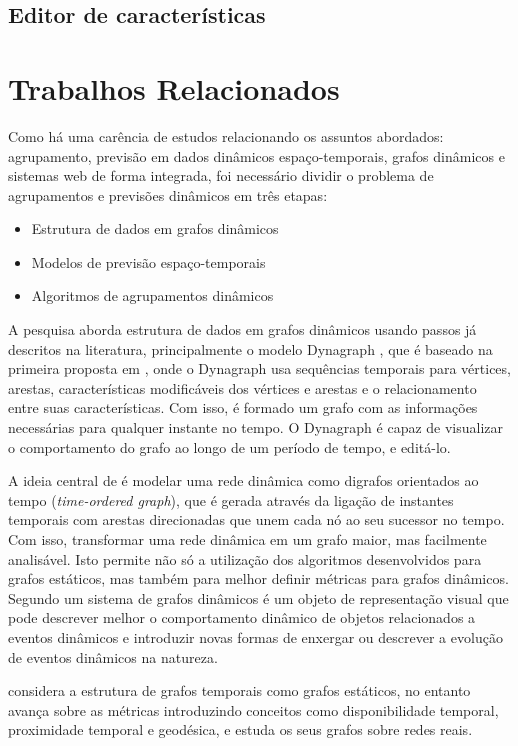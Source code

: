 \subsection{Editor de características}
\section{Trabalhos Relacionados}
 \label{trabalhos-relacionados} 
Como há uma carência de estudos relacionando os assuntos abordados: agrupamento,
previsão em dados dinâmicos espaço-temporais, grafos dinâmicos e sistemas web
de forma integrada, foi necessário dividir o problema de agrupamentos e previsões dinâmicos em três etapas:
\begin{itemize}
\item Estrutura de dados em grafos dinâmicos
\item Modelos de previsão espaço-temporais
\item Algoritmos de agrupamentos dinâmicos
\end{itemize}

A pesquisa aborda estrutura de dados em grafos dinâmicos usando passos já descritos na literatura,
principalmente o modelo Dynagraph \cite{dynagraph}, que é baseado na primeira proposta
em \cite{dynagraph2012}, onde o Dynagraph usa sequências temporais para vértices, arestas,
características modificáveis dos vértices e arestas e o relacionamento entre suas características.
Com isso, é formado um grafo com as informações necessárias para qualquer instante no tempo.
O Dynagraph é capaz de visualizar o comportamento do grafo ao longo de um período de tempo,
e editá-lo.

A ideia central de \cite{kim} é modelar uma rede dinâmica como digrafos orientados ao
tempo (\textit{time-ordered graph}), que é gerada através da ligação de instantes temporais com arestas
direcionadas que unem cada nó ao seu sucessor no tempo. Com isso, transformar uma rede dinâmica
em um grafo maior, mas facilmente analisável. Isto permite não só a utilização dos algoritmos 
desenvolvidos para grafos estáticos, mas também para melhor definir métricas para grafos dinâmicos.
Segundo \cite{kim} um sistema de grafos dinâmicos é um objeto de representação visual
que pode descrever melhor o comportamento dinâmico de objetos relacionados a eventos dinâmicos e
introduzir novas formas de enxergar ou descrever a evolução de eventos dinâmicos na natureza.

\cite{kostakos} considera a estrutura de grafos temporais como grafos
estáticos, no entanto avança sobre as métricas introduzindo conceitos como disponibilidade
temporal, proximidade temporal e geodésica, e estuda os seus grafos sobre redes reais.

